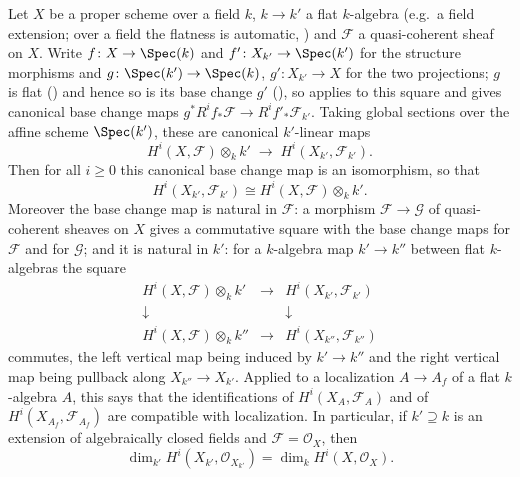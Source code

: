 \begin{lemma}
\label{lem:pcb-flat-base-change-coherent}
Let \(X\) be a proper scheme over a field \(k\), \(k\to k'\) a flat
\(k\)-algebra (e.g.\ a field extension; over a field the flatness is
automatic, ) and \(\mathcal F\) a
quasi-coherent sheaf on \(X\).  Write \(f\colon X\to\Spec(k)\) and
\(f'\colon X_{k'}\to\Spec(k')\) for the structure morphisms and
\(g\colon\Spec(k')\to\Spec(k)\), \(g'\colon X_{k'}\to X\) for the two
projections; \(g\) is flat () and hence so is
its base change \(g'\) (), so
 applies to this square and gives canonical
base change maps \(g^*R^if_*\mathcal F\to R^if'_*\mathcal F_{k'}\).
Taking global sections over the affine scheme \(\Spec(k')\), these are
canonical \(k'\)-linear maps
\[
 H^i(X,\mathcal F)\otimes_kk'\;\longrightarrow\;H^i(X_{k'},\mathcal F_{k'}).
\]
Then for all \(i\geq0\) this canonical base change map is an
isomorphism, so that
\[
 H^i(X_{k'},\mathcal F_{k'})\cong H^i(X,\mathcal F)\otimes_kk'.
\]
Moreover the base change map is natural in \(\mathcal F\): a morphism
\(\mathcal F\to\mathcal G\) of quasi-coherent sheaves on \(X\) gives a
commutative square with the base change maps for \(\mathcal F\) and for
\(\mathcal G\); and it is natural in \(k'\): for a \(k\)-algebra map
\(k'\to k''\) between flat \(k\)-algebras the square
\[
\begin{array}{ccc}
H^i(X,\mathcal F)\otimes_kk' & \longrightarrow & H^i(X_{k'},\mathcal F_{k'})\\[-2pt]
\downarrow & & \downarrow\\[-2pt]
H^i(X,\mathcal F)\otimes_kk'' & \longrightarrow & H^i(X_{k''},\mathcal F_{k''})
\end{array}
\]
commutes, the left vertical map being induced by \(k'\to k''\) and the
right vertical map being pullback along \(X_{k''}\to X_{k'}\).  Applied
to a localization \(A\to A_f\) of a flat \(k\)-algebra \(A\), this says
that the identifications of \(H^i(X_A,\mathcal F_A)\) and of
\(H^i(X_{A_f},\mathcal F_{A_f})\) are compatible with localization.
In particular, if \(k'\supseteq k\) is an extension of algebraically
closed fields and \(\mathcal F=\mathcal O_X\), then
\[
 \dim_{k'}H^i(X_{k'},\mathcal O_{X_{k'}})=\dim_kH^i(X,\mathcal O_X).
\]
\end{lemma}
